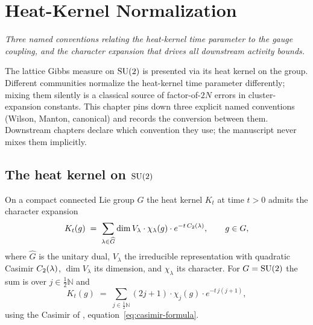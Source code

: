 %

\chapter{Heat-Kernel Normalization}
\label{ch:heat-kernel}

\noindent\emph{Three named conventions relating the heat-kernel time
parameter to the gauge coupling, and the character expansion that
drives all downstream activity bounds.}

The lattice Gibbs measure on $\mathrm{SU}(2)$ is presented via its heat
kernel on the group.  Different communities normalize the
heat-kernel time parameter differently; mixing them silently is a
classical source of factor-of-$2N$ errors in cluster-expansion
constants.  This chapter pins down three explicit named conventions
(Wilson, Manton, canonical) and records the conversion between them.
Downstream chapters declare which convention they use; the
manuscript never mixes them implicitly.

\section{The heat kernel on \texorpdfstring{$\mathrm{SU}(2)$}{SU(2)}}
\label{sec:heat-kernel-su2}

%
On a compact connected Lie group $G$ the heat kernel $K_t$ at time
$t > 0$ admits the character expansion
\begin{equation}
  \label{eq:heat-kernel-character-expansion}
  K_t(g) \;=\; \sum_{\lambda \in \widehat{G}}
    \dim V_\lambda \cdot \chi_\lambda(g)
    \cdot e^{-t\, C_2(\lambda)} ,
  \qquad g \in G,
\end{equation}
where $\widehat{G}$ is the unitary dual, $V_\lambda$ the
irreducible representation with quadratic Casimir
$C_2(\lambda)$, $\dim V_\lambda$ its dimension, and
$\chi_\lambda$ its character.  For $G = \mathrm{SU}(2)$ the sum is over
$j \in \tfrac12\mathbb{N}$ and
\begin{equation}
  \label{eq:heat-kernel-su2}
  K_t(g) \;=\; \sum_{j \in \tfrac12\mathbb{N}}
    (2j + 1) \cdot \chi_j(g) \cdot e^{-t\,j(j+1)} ,
\end{equation}
using the Casimir of ,
equation~\eqref{eq:casimir-formula}.

